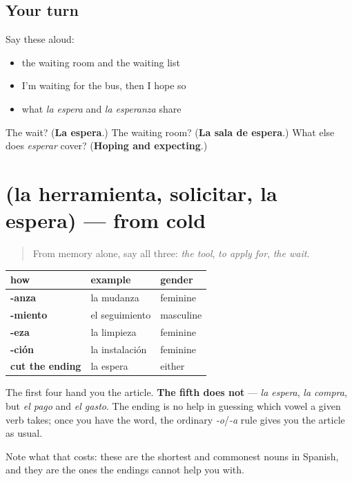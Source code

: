 \subsection*{Your turn}
Say these aloud:

\begin{itemize}
\raggedright
  \item the waiting room and the waiting list
  \item I'm waiting for the bus, then I hope so
  \item what \emph{la espera} and \emph{la esperanza} share
\end{itemize}

\begin{tcolorbox}[breakable,colback=teal!4,colframe=teal!35!black,title={Before you move on}]
The wait? (\textbf{La espera}.) The waiting room? (\textbf{La sala de espera}.) What else does \emph{esperar} cover? (\textbf{Hoping and expecting}.)
\end{tcolorbox}
\section[(la herramienta, solicitar, la espera)]{(la herramienta, solicitar, la espera) — from cold}

\label{lesson:ES-R460-repaso-pedir}



\begin{quote}
From memory alone, say all three: \emph{the tool}, \emph{to apply for}, \emph{the wait}.
\end{quote}

\begin{grammarlens}[title={Grammar Lens: five ways to a noun, now complete}]
\noindent
\begin{tabularx}{\linewidth}{@{}>{\raggedright\arraybackslash}X>{\raggedright\arraybackslash}X>{\raggedright\arraybackslash}X@{}}
\toprule
\textbf{how} & \textbf{example} & \textbf{gender} \\
\midrule
\textbf{-anza} & la mudanza & feminine \\
\textbf{-miento} & el seguimiento & masculine \\
\textbf{-eza} & la limpieza & feminine \\
\textbf{-ción} & la instalación & feminine \\
\textbf{cut the ending} & la espera & either \\
\bottomrule
\end{tabularx}

The first four hand you the article. \textbf{The fifth does not} — \emph{la espera}, \emph{la compra}, but \emph{el pago} and \emph{el gasto}. The ending is no help in guessing which vowel a given verb takes; once you have the word, the ordinary \emph{-o}/\emph{-a} rule gives you the article as usual.

Note what that costs: these are the shortest and commonest nouns in Spanish, and they are the ones the endings cannot help you with.
\end{grammarlens}

